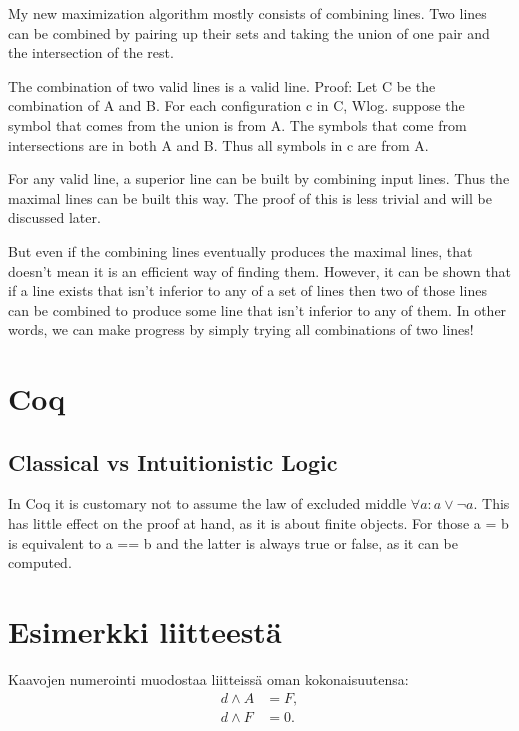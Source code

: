 \documentclass[english, 12pt, a4paper, sci, utf8, a-1b, online]{aaltothesis}
\begin{document}
My new maximization algorithm mostly consists of combining lines. Two lines can be combined by pairing up their sets and taking the union of one pair and the intersection of the rest.

The combination of two valid lines is a valid line. Proof: Let C be the combination of A and B. For each configuration c in C, Wlog. suppose the symbol that comes from the union is from A. The symbols that come from intersections are in both A and B. Thus all symbols in c are from A.

For any valid line, a superior line can be built by combining input lines. Thus the maximal lines can be built this way. The proof of this is less trivial and will be discussed later.

But even if the combining lines eventually produces the maximal lines, that doesn't mean it is an efficient way of finding them. However, it can be shown that if a line exists that isn't inferior to any of a set of lines then two of those lines can be combined to produce some line that isn't inferior to any of them. In other words, we can make progress by simply trying all combinations of two lines!

\section{Coq}

\subsection{Classical vs Intuitionistic Logic}

In Coq it is customary not to assume the law of excluded middle $\forall a : a \lor \lnot a$. This has little effect on the proof at hand, as it is about finite objects. For those a = b is equivalent to a == b and the latter is always true or false, as it can be computed.

\clearpage
\thesisbibliography{}




\clearpage
\thesisappendix{}

\section{Esimerkki liitteestä\label{LiiteA}}

Kaavojen numerointi muodostaa liitteissä oman kokonaisuutensa:
\begin{align}
d \wedge A &= F, \label{liitekaava1}\\
d \wedge F &= 0. \label{liitekaava2}
\end{align}
\end{document}
